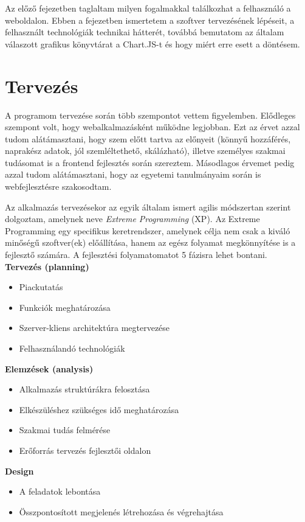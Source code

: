 
Az előző fejezetben taglaltam milyen fogalmakkal találkozhat a felhasználó a weboldalon. Ebben a fejezetben ismertetem a szoftver tervezésének lépéseit, a felhasznált technológiák technikai hátterét, továbbá bemutatom az általam válaszott grafikus könyvtárat a Chart.JS-t és hogy miért erre esett a döntésem.

\section{Tervezés \cite{agile}}

A programom tervezése során több szempontot vettem figyelemben. Elődleges szempont volt, hogy webalkalmazásként működne legjobban. Ezt az érvet azzal tudom alátámasztani, hogy szem előtt tartva az előnyeit (könnyű hozzáférés, naprakész adatok, jól szemléltethető, skálázható), illetve személyes szakmai tudásomat is a frontend fejlesztés során szereztem. Másodlagos érvemet pedig azzal tudom alátámasztani, hogy az egyetemi tanulmányaim során is webfejlesztésre szakosodtam.

	Az alkalmazás tervezésekor az egyik általam ismert agilis módszertan szerint dolgoztam, amelynek neve \emph{Extreme Programming} (XP). Az Extreme Programming egy specifikus keretrendszer, amelynek célja nem csak a kiváló minőségű szoftver(ek) előállítása, hanem az egész folyamat megkönnyítése is a fejlesztő számára.  A fejlesztési folyamatomatot 5 fázisra lehet bontani. \\

\textbf{Tervezés (planning)}
\begin{itemize}
\item Piackutatás
\item Funkciók meghatározása
\item Szerver-kliens architektúra megtervezése
\item Felhasználandó technológiák
\end{itemize}

\textbf{Elemzések (analysis)}
\begin{itemize}
\item Alkalmazás struktúrákra felosztása
\item Elkészüléshez szükséges idő meghatározása
\item Szakmai tudás felmérése
\item Erőforrás tervezés fejlesztői oldalon
\end{itemize}

\textbf{Design}
\begin{itemize}
\item A feladatok lebontása
\item Összpontosított megjelenés létrehozása és végrehajtása
\end{itemize}

